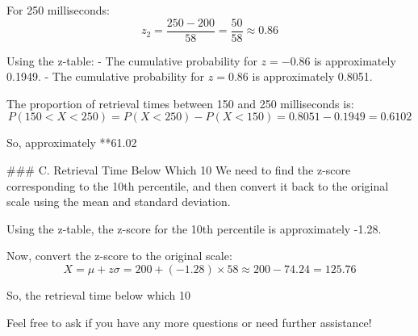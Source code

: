 For 250 milliseconds:
$$z_2 = \frac{250 - 200}{58} = \frac{50}{58} \approx 0.86$$

Using the z-table:
- The cumulative probability for $ z = -0.86 $ is approximately 0.1949.
- The cumulative probability for $ z = 0.86 $ is approximately 0.8051.

The proportion of retrieval times between 150 and 250 milliseconds is:
$$P(150 < X < 250) = P(X < 250) - P(X < 150) = 0.8051 - 0.1949 = 0.6102$$

So, approximately **61.02%

### C. Retrieval Time Below Which 10%
We need to find the z-score corresponding to the 10th percentile, and then convert it back to the original scale using the mean and standard deviation.

Using the z-table, the z-score for the 10th percentile is approximately -1.28.

Now, convert the z-score to the original scale:
$$X = \mu + z \sigma = 200 + (-1.28) \times 58 \approx 200 - 74.24 = 125.76$$

So, the retrieval time below which 10%

Feel free to ask if you have any more questions or need further assistance!